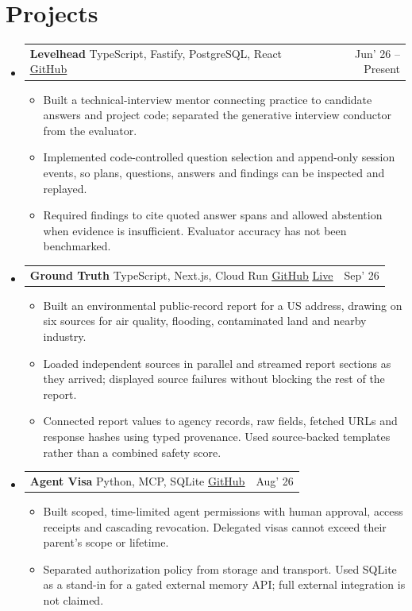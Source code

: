 \documentclass[a4paper,10pt]{article}
\makeatletter
\newcommand{\resumeItem}[1]{\item\normalsize{#1\vspace{-3pt}}}
\newcommand{\resumeProjectHeading}[2]{
  \item
  \begin{tabular*}{\textwidth}{l@{\extracolsep{\fill}}r}
    \fontsize{10}{12}\selectfont#1 & \normalsize #2 \\
  \end{tabular*}\vspace{-6pt}
}
\newcommand{\resumeSubHeadingListStart}{\begin{itemize}[leftmargin=0in, label={}]}
\newcommand{\resumeSubHeadingListEnd}{\end{itemize}}
\newcommand{\resumeItemListStart}{\begin{itemize}[leftmargin=0.2in]}
\newcommand{\resumeItemListEnd}{\end{itemize}\vspace{-5pt}}
\makeatother
\begin{document}
\section{Projects}
\resumeSubHeadingListStart
  \resumeProjectHeading
    {\textbf{\textcolor{LPUBlue}{Levelhead}} \normalsize\textbar{} TypeScript, Fastify, PostgreSQL, React \normalsize\textbar{} \href{https://github.com/opx0/CLOSURE}{\underline{GitHub}}}{Jun' 26 -- Present}
  \resumeItemListStart
    \resumeItem{Built a technical-interview mentor connecting practice to candidate answers and project code; separated the generative interview conductor from the evaluator.}
    \resumeItem{Implemented code-controlled question selection and append-only session events, so plans, questions, answers and findings can be inspected and replayed.}
    \resumeItem{Required findings to cite quoted answer spans and allowed abstention when evidence is insufficient. Evaluator accuracy has not been benchmarked.}
  \resumeItemListEnd

  \resumeProjectHeading
    {\textbf{\textcolor{LPUBlue}{Ground Truth}} \normalsize\textbar{} TypeScript, Next.js, Cloud Run \normalsize\textbar{} \href{https://github.com/opx0/groundtruth}{\underline{GitHub}} \normalsize\textbar{} \href{https://ground-truth-946486142611.us-central1.run.app}{\underline{Live}}}{Sep' 26}
  \resumeItemListStart
    \resumeItem{Built an environmental public-record report for a US address, drawing on six sources for air quality, flooding, contaminated land and nearby industry.}
    \resumeItem{Loaded independent sources in parallel and streamed report sections as they arrived; displayed source failures without blocking the rest of the report.}
    \resumeItem{Connected report values to agency records, raw fields, fetched URLs and response hashes using typed provenance. Used source-backed templates rather than a combined safety score.}
  \resumeItemListEnd

  \resumeProjectHeading
    {\textbf{\textcolor{LPUBlue}{Agent Visa}} \normalsize\textbar{} Python, MCP, SQLite \normalsize\textbar{} \href{https://github.com/opx0/agent-visa}{\underline{GitHub}}}{Aug' 26}
  \resumeItemListStart
    \resumeItem{Built scoped, time-limited agent permissions with human approval, access receipts and cascading revocation. Delegated visas cannot exceed their parent's scope or lifetime.}
    \resumeItem{Separated authorization policy from storage and transport. Used SQLite as a stand-in for a gated external memory API; full external integration is not claimed.}
  \resumeItemListEnd
\resumeSubHeadingListEnd
\end{document}

